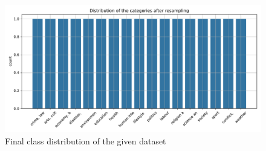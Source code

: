 \begin{figure}[htpb]
	\centering
	\includegraphics[width=\linewidth]{Images/final_class_distribution.pdf}
	\caption{Final class distribution of the given dataset}
	\label{fig:final_class_distribution}
\end{figure}
